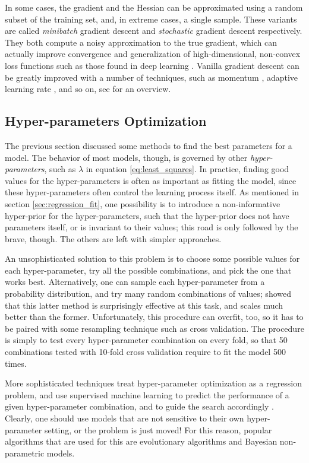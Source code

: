 \documentclass[a4paper,11pt]{kth-mag}
\begin{document}
In some cases, the gradient and the Hessian can be approximated using a random subset of the training set, and, in extreme cases, a single sample. These variants are called \emph{minibatch} gradient descent and \emph{stochastic} gradient descent respectively. They both compute a noisy approximation to the true gradient, which can actually improve convergence and generalization of high-dimensional, non-convex loss functions such as those found in deep learning \citep{sgd_noise, bayesian_sgd}. Vanilla gradient descent can be greatly improved with a number of techniques, such as momentum \citep{gd_momentum}, adaptive learning rate \citep{adagrad, adadelta, adam}, and so on, see \cite{gd_overview} for an overview. 

\subsection{Hyper-parameters Optimization}
\label{sec:hyperopt}
The previous section discussed some methods to find the best parameters for a model. The behavior of most models, though, is governed by other \emph{hyper-parameters}, such as $\lambda$ in equation \ref{eq:least_squares}. In practice, finding good values for the hyper-parameters is often as important as fitting the model, since these hyper-parameters often control the learning process itself. As mentioned in section \ref{sec:regression_fit}, one possibility is to introduce a non-informative hyper-prior for the hyper-parameters, such that the hyper-prior does not have parameters itself, or is invariant to their values; this road is only followed by the brave, though. The others are left with simpler approaches.

An unsophisticated solution to this problem is to choose some possible values for each hyper-parameter, try all the possible combinations, and pick the one that works best. Alternatively, one can sample each hyper-parameter from a probability distribution, and try many random combinations of values; \cite{random_search} showed that this latter method is surprisingly effective at this task, and scales much better than the former. Unfortunately, this procedure can overfit, too, so it has to be paired with some resampling technique such as cross validation. The procedure is simply to test every hyper-parameter combination on every fold, so that 50 combinations tested with 10-fold cross validation require to fit the model 500 times.

More sophisticated techniques treat hyper-parameter optimization as a regression problem, and use supervised machine learning to predict the performance of a given hyper-parameter combination, and to guide the search accordingly \citep{hyperopt}. Clearly, one should use models that are not sensitive to their own hyper-parameter setting, or the problem is just moved! For this reason, popular algorithms that are used for this are evolutionary algorithms and Bayesian non-parametric models.
\end{document}
